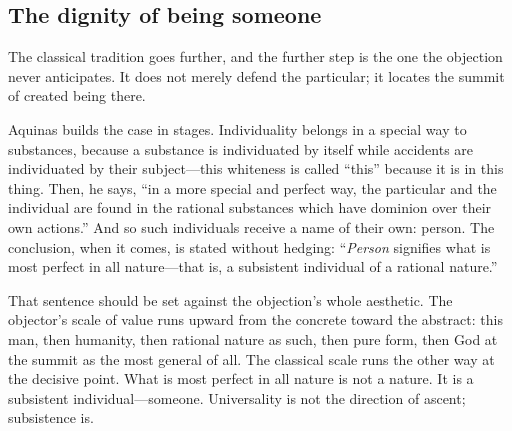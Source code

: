 \subsection{The dignity of being someone}

The classical tradition goes further, and the further step is the one the objection never anticipates. It does not merely defend the particular; it locates the summit of created being there.

Aquinas builds the case in stages. Individuality belongs in a special way to substances, because a substance is individuated by itself while accidents are individuated by their subject---this whiteness is called ``this'' because it is in this thing. Then, he says, ``in a more special and perfect way, the particular and the individual are found in the rational substances which have dominion over their own actions.'' And so such individuals receive a name of their own: person. The conclusion, when it comes, is stated without hedging: ``\emph{Person} signifies what is most perfect in all nature---that is, a subsistent individual of a rational nature.''

That sentence should be set against the objection's whole aesthetic. The objector's scale of value runs upward from the concrete toward the abstract: this man, then humanity, then rational nature as such, then pure form, then God at the summit as the most general of all. The classical scale runs the other way at the decisive point. What is most perfect in all nature is not a nature. It is a subsistent individual---someone. Universality is not the direction of ascent; subsistence is.


